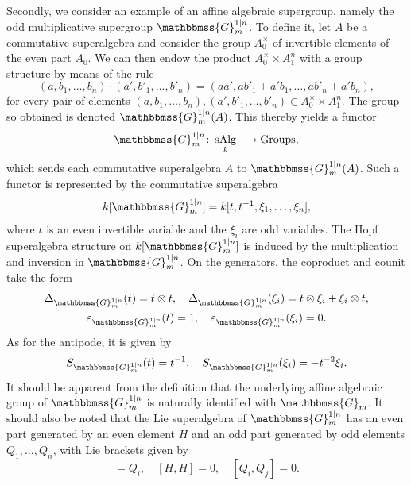 \documentclass[11pt,a4paper,reqno,noamsfonts]{amsart}
\numberwithin{equation}{section}
\theoremstyle{definition}
\theoremstyle{remark}
\newcommand{\GG}{\ensuremath{\mathbbmss{G}}}
\DeclareMathOperator{\sAlg}{sAlg}
\DeclareMathOperator{\Groups}{Groups}
\begin{document}
Secondly, we consider an example of an affine algebraic supergroup, namely the odd multiplicative supergroup $\GG_m^{1\vert n}$. To define it, let $A$ be a commutative superalgebra and consider the group $A_0^\times$ of invertible elements of the even part $A_0$. We can then endow the product $A_0^\times \times A_1^n$ with a group structure by means of the rule
\begin{equation}
(a, b_1, \dots, b_n) \cdot (a', b'_1, \dots, b'_n) = (aa', ab'_1 + a'b_1, \dots, ab'_n + a'b_n),
\end{equation}
for every pair of elements $(a, b_1, \dots, b_n), (a', b'_1, \dots, b'_n) \in A_0^\times \times A_1^n$. The group so obtained is denoted $\GG_m^{1\vert n}(A)$. This thereby yields a functor
\begin{equation}
\GG_m^{1\vert n} \colon \sAlg_k \longrightarrow \Groups,
\end{equation}
which sends each commutative superalgebra $A$ to $\GG_m^{1\vert n}(A)$. Such a functor is represented by the commutative superalgebra
\begin{equation}
k[\GG_m^{1\vert n}] = k[t,t^{-1},\xi_1,\dots,\xi_n],
\end{equation}
where $t$ is an even invertible variable and the $\xi_i$ are odd variables. The Hopf superalgebra structure on $k[\GG_m^{1\vert n}]$ is induced by the multiplication and inversion in $\GG_m^{1 \vert n}$. On the generators, the coproduct and counit take the form
\begin{equation}
\begin{gathered}
\Delta_{\GG_m^{1\vert n}}(t) = t \otimes t, \quad \Delta_{\GG_m^{1\vert n}}(\xi_i) = t \otimes \xi_i + \xi_i \otimes t,\\
\varepsilon_{\GG_m^{1\vert n}}(t) = 1, \quad \varepsilon_{\GG_m^{1\vert n}}(\xi_i) =0.
\end{gathered}
\end{equation}
As for the antipode, it is given by
\begin{equation}
S_{\GG_m^{1\vert n}}(t)=t^{-1}, \quad S_{\GG_m^{1\vert n}}(\xi_i) = -t^{-2} \xi_i.
\end{equation}
It should be apparent from the definition that the underlying affine algebraic group of $\GG_m^{1\vert n}$ is naturally identified with $\GG_m$. It should also be noted that the Lie superalgebra of $\GG_m^{1\vert n}$ has an even part generated by an even element $H$ and an odd part generated by odd elements $Q_1,\dots,Q_n$, with Lie brackets given by
\begin{equation}
[H,Q_i] = Q_i, \quad [H,H] = 0, \quad  [Q_i,Q_j] = 0.
\end{equation}
\end{document}
